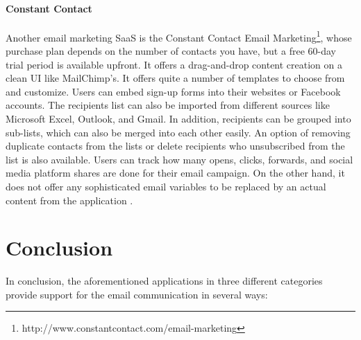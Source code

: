 \paragraph{Constant Contact}
Another email marketing \ac{SaaS} is the Constant Contact Email Marketing\footnote{http://www.constantcontact.com/email-marketing}, whose purchase plan depends on the number of contacts you have, but a free 60-day trial period is available upfront. It offers a drag-and-drop content creation on a clean \ac{UI} like MailChimp's. It offers quite a number of templates to choose from and customize. Users can embed sign-up forms into their websites or Facebook accounts. The recipients list can also be imported from different sources like Microsoft Excel, Outlook, and Gmail. In addition, recipients can be grouped into sub-lists, which can also be merged into each other easily. An option of removing duplicate contacts from the lists or delete recipients who unsubscribed from the list is also available. Users can track how many opens, clicks, forwards, and social media platform shares are done for their email campaign. On the other hand, it does not offer any sophisticated email variables to be replaced by an actual content from the application \citep{ConstantContactInc.2013,ConstantContactInc.2013a,ConstantContactInc.2011}. 

\clearpage

\section{Conclusion}
\label{sec:3.3:Conc}
In conclusion, the aforementioned applications in three different categories provide support for the email communication in several ways:

